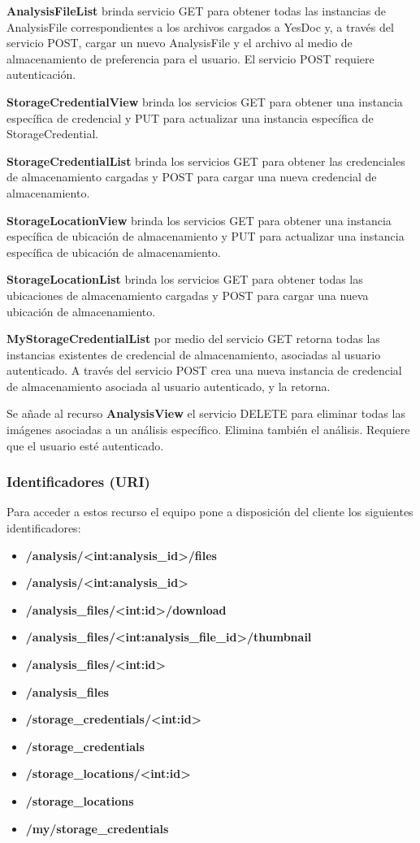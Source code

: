 \textbf{AnalysisFileList} brinda servicio GET para obtener todas las instancias de AnalysisFile correspondientes a los archivos cargados a YesDoc y, a través del servicio POST, cargar un nuevo AnalysisFile y el archivo al medio de almacenamiento de preferencia para el usuario. El servicio POST requiere autenticación.

\textbf{StorageCredentialView} brinda los servicios GET para obtener una instancia específica de credencial y PUT para actualizar una instancia específica de StorageCredential.

\textbf{StorageCredentialList} brinda los servicios GET para obtener las credenciales de almacenamiento cargadas y POST para cargar una nueva credencial de almacenamiento.

\textbf{StorageLocationView} brinda los servicios GET para obtener una instancia específica de ubicación de almacenamiento y PUT para actualizar una instancia específica de ubicación de almacenamiento.	

\textbf{StorageLocationList} brinda los servicios GET para obtener todas las ubicaciones de almacenamiento cargadas y POST para cargar una nueva ubicación de almacenamiento.

\textbf{MyStorageCredentialList} por medio del servicio GET retorna todas las instancias existentes de credencial de almacenamiento, asociadas al usuario autenticado. A través del servicio POST crea una nueva instancia de credencial de almacenamiento asociada al usuario autenticado, y la retorna.

Se añade al recurso \textbf{AnalysisView} el servicio DELETE para eliminar todas las imágenes asociadas a un análisis específico. Elimina también el análisis. Requiere que el usuario esté autenticado.

\subsubsection{Identificadores (URI)}
Para acceder a estos recurso el equipo pone a disposición del cliente los siguientes identificadores:

\begin{itemize}
	\item\textbf{/analysis/<int:analysis\_id>/files}
	\item\textbf{/analysis/<int:analysis\_id>}
	\item\textbf{/analysis\_files/<int:id>/download}
	\item\textbf{/analysis\_files/<int:analysis\_file\_id>/thumbnail}
	\item\textbf{/analysis\_files/<int:id>}
	\item\textbf{/analysis\_files}
	\item\textbf{/storage\_credentials/<int:id>}
	\item\textbf{/storage\_credentials}
	\item\textbf{/storage\_locations/<int:id>}
	\item\textbf{/storage\_locations}
	\item\textbf{/my/storage\_credentials}
\end{itemize}


